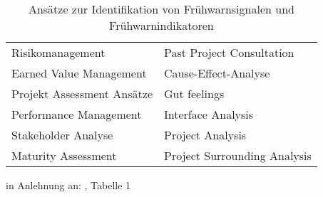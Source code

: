 \begin{table}[H]
	\centering
	\begin{threeparttable}
		\caption{Ansätze zur Identifikation von Frühwarnsignalen und Frühwarnindikatoren}
		\begin{tabular}{ll}
			\toprule
			Risikomanagement & Past Project Consultation\\
			Earned Value Management & Cause-Effect-Analyse\\
			Projekt Assessment Ansätze & Gut feelings \\
			Performance Management & Interface Analysis\\
			Stakeholder Analyse & Project Analysis \\
			Maturity Assessment & Project Surrounding Analysis\\
			\bottomrule
		\end{tabular}
		\begin{tablenotes}
			\small
			\item in Anlehnung an: \citet{haan13}, Tabelle 1
		\end{tablenotes}
	\label{tab:Ans}
	\end{threeparttable}
\end{table}
